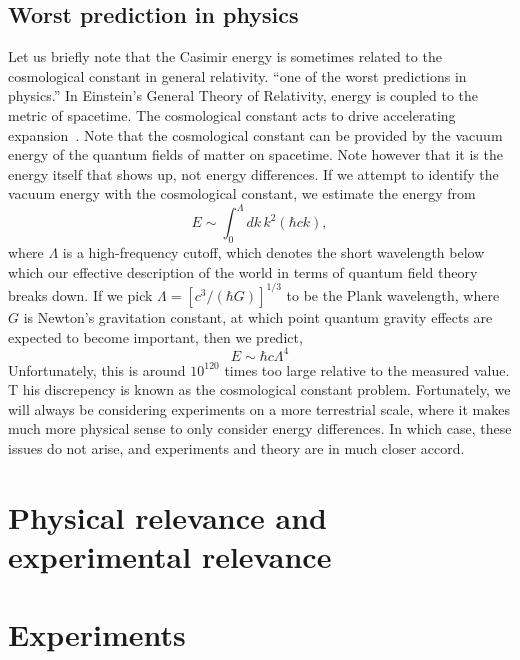 \subsection{Worst prediction in physics}

Let us briefly note that the Casimir energy is sometimes related to the cosmological constant in general relativity.
  ``one of the worst predictions in physics.''  
In Einstein's General Theory of Relativity, energy is coupled to the metric of spacetime.
  The cosmological constant acts to drive accelerating expansion~\cite{Carroll2004}.
  Note that the cosmological constant can be provided by the vacuum energy of the quantum fields of matter on spacetime.
  Note however that it is the energy itself that shows up, not energy differences. 
If we attempt to identify the vacuum energy with the cosmological constant, we estimate the energy from 
\begin{equation}
E \sim \int_0^\Lambda dk\,k^2 (\hbar c k),
\end{equation}
where $\Lambda$ is a high-frequency cutoff, which denotes the short wavelength
 below which our effective description of the world in terms of quantum 
field theory breaks down.
  If we pick $\Lambda=[c^3/(\hbar G)]^{1/3}$ to be the Plank wavelength, 
where $G$ is Newton's gravitation constant, at which point quantum gravity
 effects are expected to become important, then we predict, 
\begin{equation}
E \sim \hbar c \Lambda^4 
\end{equation}
Unfortunately, this is around $10^{120}$ times too large relative to the 
measured value.  T
his discrepency is known as the cosmological constant problem.  
Fortunately, we will always be considering experiments on a more terrestrial scale,
 where it makes much more physical sense to only consider energy differences.
  In which case, these issues do not arise, and experiments and theory are in much closer accord.    


\section{Physical relevance and experimental relevance}

\section{Experiments}

